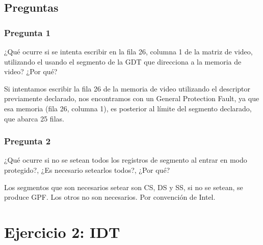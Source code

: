 \documentclass[10pt, a4paper]{article}
\begin{document}
\subsection{Preguntas}
\subsubsection{Pregunta 1}
\begin{framed}
¿Qué ocurre si se intenta escribir en la fila 26, columna 1 de la matriz de video, utilizando el usando el segmento de la GDT que direcciona a la memoria de video?
¿Por qué?
\end{framed}
Si intentamos escribir la fila 26 de la memoria de video utilizando 
el descriptor previamente declarado, 
nos encontramos con un General Protection Fault, ya que esa 
memoria (fila 26, 
columna 1), es 
posterior al límite
 del segmento declarado, 
que abarca 25 filas.
\subsubsection*{Pregunta 2}
 \begin{framed}
¿Qué ocurre si no se setean todos los registros de segmento al entrar en modo protegido?, ¿Es necesario setearlos todos?, ¿Por qué?
\end{framed}
Los segmentos que son necesarios setear son CS, DS y SS, si no se setean, se produce GPF. Los otros no son necesarios. Por convención de Intel. %

\section{Ejercicio 2: IDT}
\end{document}
